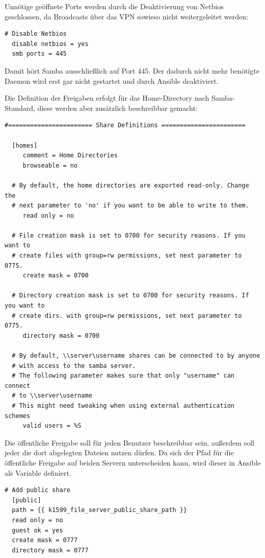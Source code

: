 Unnötige geöffnete Ports werden durch die Deaktivierung von Netbios geschlossen, da Broadcasts über das VPN sowieso nicht weitergeleitet werden:
\begin{lstlisting}[label=code:smbconf5,caption=Auszug aus /etc/samba/smb.conf]
  # Disable Netbios
  disable netbios = yes
  smb ports = 445
\end{lstlisting}
Damit hört Samba ausschließlich auf Port 445. Der dadurch nicht mehr benötigte Daemon  wird erst gar nicht gestartet und durch Ansible deaktiviert.

Die Definition der Freigaben erfolgt für das Home-Directory nach Samba-Standard, diese werden aber zusätzlich beschreibbar gemacht:

\begin{lstlisting}[label=code:smbconf5,caption=Auszug aus /etc/samba/smb.conf]
  #======================= Share Definitions =======================

  [homes]
     comment = Home Directories
     browseable = no

  # By default, the home directories are exported read-only. Change the
  # next parameter to 'no' if you want to be able to write to them.
     read only = no

  # File creation mask is set to 0700 for security reasons. If you want to
  # create files with group=rw permissions, set next parameter to 0775.
     create mask = 0700

  # Directory creation mask is set to 0700 for security reasons. If you want to
  # create dirs. with group=rw permissions, set next parameter to 0775.
     directory mask = 0700

  # By default, \\server\username shares can be connected to by anyone
  # with access to the samba server.
  # The following parameter makes sure that only "username" can connect
  # to \\server\username
  # This might need tweaking when using external authentication schemes
     valid users = %S
\end{lstlisting}

Die öffentliche Freigabe soll für jeden Benutzer beschreibbar sein, außerdem soll jeder die dort abgelegten Dateien nutzen dürfen. Da sich der Pfad für die öffentliche Freigabe auf beiden Servern unterscheiden kann, wird dieser in Ansible als Variable definiert.

\begin{lstlisting}[label=code:smbconf5,caption=Auszug aus /etc/samba/smb.conf]
  # Add public share
  [public]
  path = {{ k1599_file_server_public_share_path }}
  read only = no
  guest ok = yes
  create mask = 0777
  directory mask = 0777
\end{lstlisting}

